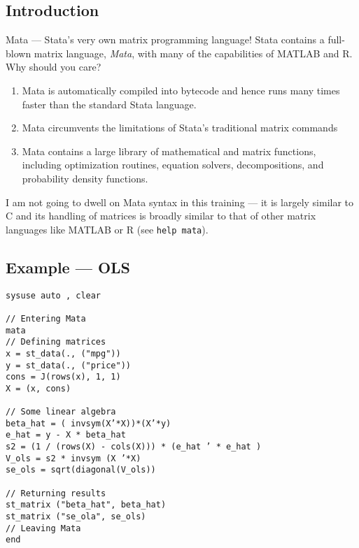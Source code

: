 \documentclass[fleqn, handout, 10pt]{beamer}
\def\lst{\lstinline}
\begin{document}
\subsection{Introduction}

\begin{frame}{Mata --- Stata's very own matrix programming language!}
    Stata contains a full-blown matrix language, \emph{Mata}, with many of the capabilities of MATLAB and R. Why should you care?
    \begin{enumerate}
        \item Mata is automatically compiled into bytecode and hence runs many times faster than the standard Stata language.
        \item Mata circumvents the limitations of Stata's traditional matrix commands
        \item Mata contains a large library of mathematical and matrix functions, including optimization routines, equation solvers, decompositions, and probability density functions.
    \end{enumerate}
    I am not going to dwell on Mata syntax in this training --- it is largely similar to C and its handling of matrices is broadly similar to that of other matrix languages like MATLAB or R (see \lst=help mata=).
\end{frame}

\subsection{Example --- OLS}

\begin{frame}[fragile]
    \begin{lstlisting}
sysuse auto , clear

// Entering Mata
mata
// Defining matrices
x = st_data(., ("mpg"))
y = st_data(., ("price"))
cons = J(rows(x), 1, 1)
X = (x, cons)

// Some linear algebra
beta_hat = ( invsym(X’*X))*(X’*y)
e_hat = y - X * beta_hat
s2 = (1 / (rows(X) - cols(X))) * (e_hat ’ * e_hat )
V_ols = s2 * invsym (X ’*X)
se_ols = sqrt(diagonal(V_ols))

// Returning results
st_matrix ("beta_hat", beta_hat)
st_matrix ("se_ola", se_ols)
// Leaving Mata
end
    \end{lstlisting}
\end{frame}
\end{document}
